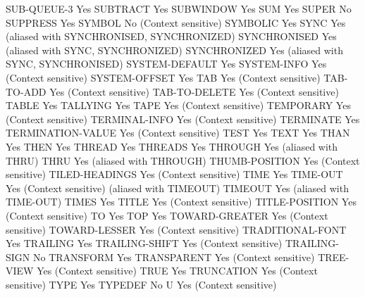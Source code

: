 SUB-QUEUE-3                     Yes
SUBTRACT                        Yes
SUBWINDOW                       Yes
SUM                             Yes
SUPER                           No
SUPPRESS                        Yes
SYMBOL                          No (Context sensitive)
SYMBOLIC                        Yes
SYNC                            Yes (aliased with SYNCHRONISED, SYNCHRONIZED)
SYNCHRONISED                    Yes (aliased with SYNC, SYNCHRONIZED)
SYNCHRONIZED                    Yes (aliased with SYNC, SYNCHRONISED)
SYSTEM-DEFAULT                  Yes
SYSTEM-INFO                     Yes (Context sensitive)
SYSTEM-OFFSET                   Yes
TAB                             Yes (Context sensitive)
TAB-TO-ADD                      Yes (Context sensitive)
TAB-TO-DELETE                   Yes (Context sensitive)
TABLE                           Yes
TALLYING                        Yes
TAPE                            Yes (Context sensitive)
TEMPORARY                       Yes (Context sensitive)
TERMINAL-INFO                   Yes (Context sensitive)
TERMINATE                       Yes
TERMINATION-VALUE               Yes (Context sensitive)
TEST                            Yes
TEXT                            Yes
THAN                            Yes
THEN                            Yes
THREAD                          Yes
THREADS                         Yes
THROUGH                         Yes (aliased with THRU)
THRU                            Yes (aliased with THROUGH)
THUMB-POSITION                  Yes (Context sensitive)
TILED-HEADINGS                  Yes (Context sensitive)
TIME                            Yes
TIME-OUT                        Yes (Context sensitive) (aliased with TIMEOUT)
TIMEOUT                         Yes (aliased with TIME-OUT)
TIMES                           Yes
TITLE                           Yes (Context sensitive)
TITLE-POSITION                  Yes (Context sensitive)
TO                              Yes
TOP                             Yes
TOWARD-GREATER                  Yes (Context sensitive)
TOWARD-LESSER                   Yes (Context sensitive)
TRADITIONAL-FONT                Yes
TRAILING                        Yes
TRAILING-SHIFT                  Yes (Context sensitive)
TRAILING-SIGN                   No
TRANSFORM                       Yes
TRANSPARENT                     Yes (Context sensitive)
TREE-VIEW                       Yes (Context sensitive)
TRUE                            Yes
TRUNCATION                      Yes (Context sensitive)
TYPE                            Yes
TYPEDEF                         No
U                               Yes (Context sensitive)
